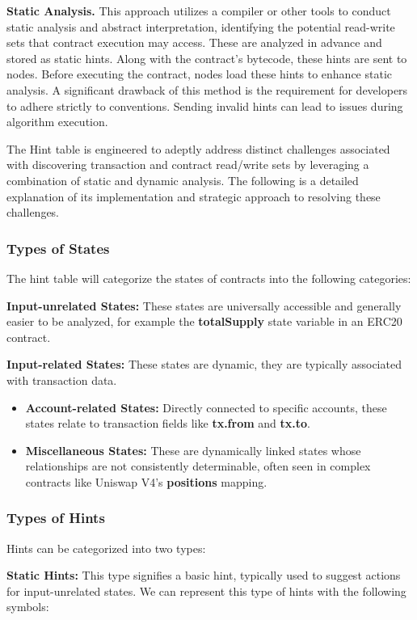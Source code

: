 \textbf{Static Analysis.} This approach utilizes a compiler or other tools to conduct static analysis and abstract interpretation, identifying the potential read-write sets that contract execution may access. These are analyzed in advance and stored as static hints. Along with the contract's bytecode, these hints are sent to nodes. Before executing the contract, nodes load these hints to enhance static analysis. A significant drawback of this method is the requirement for developers to adhere strictly to conventions. Sending invalid hints can lead to issues during algorithm execution.

The Hint table is engineered to adeptly address distinct challenges associated with discovering transaction and contract read/write sets by leveraging a combination of static and dynamic analysis. The following is a detailed explanation of its implementation and strategic approach to resolving these challenges.

\subsubsection{Types of States}

The hint table will categorize the states of contracts into the following categories:

\textbf{Input-unrelated States:} These states are universally accessible and generally easier to be analyzed, for example the \textbf{totalSupply} state variable in an ERC20 contract.

\textbf{Input-related States:} These states are dynamic, they are typically associated with transaction data.
\begin{itemize}
\item \textbf{Account-related States:} Directly connected to specific accounts, these states relate to transaction fields like \textbf{tx.from} and \textbf{tx.to}.
\item \textbf{Miscellaneous States:} These are dynamically linked states whose relationships are not consistently determinable, often seen in complex contracts like Uniswap V4's \textbf{positions} mapping.
\end{itemize}
\subsubsection{Types of Hints}

Hints can be categorized into two types:

\textbf{Static Hints:} This type signifies a basic hint, typically used to suggest actions for input-unrelated states. We can represent this type of hints with the following symbols:
    
